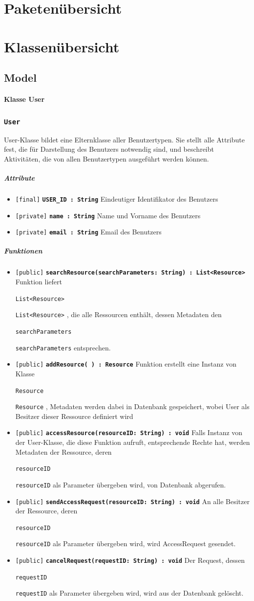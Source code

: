 \documentclass[parskip=full,11pt]{scrartcl}
\makeatletter
\newcommand{\lstInline}[2][,]{%
	\begingroup%
	\lstset{#1}%
	\begin{lrbox}{\mylisting}\lstinline!#2!\end{lrbox}%
	\setlength{\@tempdima}{\linegoal}%
	\ifdim\wd\mylisting>\@tempdima\hfill\\\fi%
	\lstinline!#2!%
	\endgroup%
}
\newcommand{\class}[1]{\subsubsection*{\lstinline[basicstyle=\ttfamily\large]{#1}}}
\newcommand{\atr}[4]{\lstinline{[#3]} \textbf{\lstinline{#1 : #2}} \newline #4}
\newcommand{\mtd}[5]{\lstinline{[#4]} \textbf{\lstinline{#1(#3) : #2}} \newline #5}
\newcommand{\inlinecode}[1]{\lstInline[breaklines=true]{#1}}
\makeatother
\begin{document}
 
 \section{Paketenübersicht}
 
 \newpage
 \section{Klassenübersicht}
 \subsection{Model}
 \paragraph*{Klasse User}
 \class{User}
 User-Klasse bildet eine Elternklasse aller Benutzertypen. Sie stellt alle Attribute fest, die für Darstellung des Benutzers notwendig sind, und beschreibt Aktivitäten, die von allen Benutzertypen ausgeführt werden können.
\subparagraph*{Attribute} %
\begin{itemize}
	\item \atr{USER_ID}{String}{final} {Eindeutiger Identifikator des Benutzers}
	\item \atr{name}{String}{private}{Name und Vorname des Benutzers}	
	\item \atr{email}{String}{private}{Email des Benutzers}
\end{itemize}

\subparagraph*{Funktionen}  %
\begin{itemize}
	\item \mtd{searchResource}{List<Resource>}{searchParameters: String} {public}{Funktion liefert  \inlinecode{List<Resource>}, die alle Ressourcen enthält, dessen Metadaten den \inlinecode{searchParameters} entsprechen.}
	
	\item \mtd{addResource}{Resource}{ }{public}{Funktion erstellt eine Instanz von Klasse \inlinecode{Resource}, Metadaten werden dabei in Datenbank gespeichert, wobei User als Besitzer dieser Ressource definiert wird}
	
	\item \mtd{accessResource}{void}{resourceID: String} {public}{Falls Instanz von der User-Klasse, die diese Funktion aufruft, entsprechende Rechte hat, werden Metadaten der Ressource, deren \inlinecode{resourceID}} als Parameter übergeben wird, von Datenbank abgerufen.
	
	\item \mtd{sendAccessRequest}{void}{resourceID: String} {public}
	{An alle Besitzer der Ressource, deren \inlinecode{resourceID} als Parameter übergeben wird, wird AccessRequest gesendet.}
	
	\item \mtd{cancelRequest}{void}{requestID: String} {public}{Der Request, dessen \inlinecode{requestID}} als Parameter übergeben wird, wird aus der Datenbank gelöscht.
\end{itemize}
\end{document}
